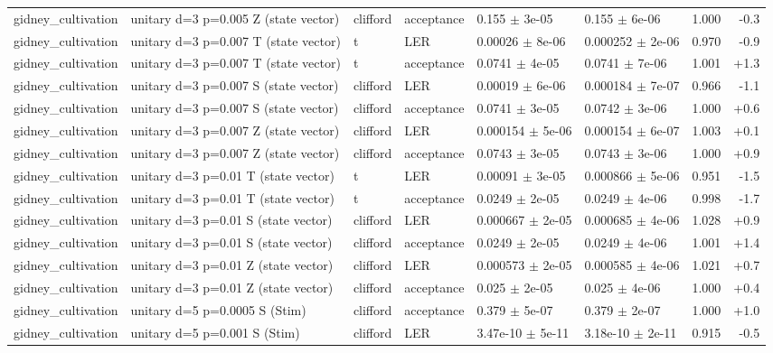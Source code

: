 \documentclass[10pt]{article}
\begin{document}
{\begin{longtable}{l l l l l l r r}
gidney\_cultivation & unitary d=3 p=0.005 Z (state vector) & clifford & acceptance & 0.155 $\pm$ 3e-05 & 0.155 $\pm$ 6e-06 & 1.000 & -0.3 \\
gidney\_cultivation & unitary d=3 p=0.007 T (state vector) & t & LER & 0.00026 $\pm$ 8e-06 & 0.000252 $\pm$ 2e-06 & 0.970 & -0.9 \\
gidney\_cultivation & unitary d=3 p=0.007 T (state vector) & t & acceptance & 0.0741 $\pm$ 4e-05 & 0.0741 $\pm$ 7e-06 & 1.001 & +1.3 \\
gidney\_cultivation & unitary d=3 p=0.007 S (state vector) & clifford & LER & 0.00019 $\pm$ 6e-06 & 0.000184 $\pm$ 7e-07 & 0.966 & -1.1 \\
gidney\_cultivation & unitary d=3 p=0.007 S (state vector) & clifford & acceptance & 0.0741 $\pm$ 3e-05 & 0.0742 $\pm$ 3e-06 & 1.000 & +0.6 \\
gidney\_cultivation & unitary d=3 p=0.007 Z (state vector) & clifford & LER & 0.000154 $\pm$ 5e-06 & 0.000154 $\pm$ 6e-07 & 1.003 & +0.1 \\
gidney\_cultivation & unitary d=3 p=0.007 Z (state vector) & clifford & acceptance & 0.0743 $\pm$ 3e-05 & 0.0743 $\pm$ 3e-06 & 1.000 & +0.9 \\
gidney\_cultivation & unitary d=3 p=0.01 T (state vector) & t & LER & 0.00091 $\pm$ 3e-05 & 0.000866 $\pm$ 5e-06 & 0.951 & -1.5 \\
gidney\_cultivation & unitary d=3 p=0.01 T (state vector) & t & acceptance & 0.0249 $\pm$ 2e-05 & 0.0249 $\pm$ 4e-06 & 0.998 & -1.7 \\
gidney\_cultivation & unitary d=3 p=0.01 S (state vector) & clifford & LER & 0.000667 $\pm$ 2e-05 & 0.000685 $\pm$ 4e-06 & 1.028 & +0.9 \\
gidney\_cultivation & unitary d=3 p=0.01 S (state vector) & clifford & acceptance & 0.0249 $\pm$ 2e-05 & 0.0249 $\pm$ 4e-06 & 1.001 & +1.4 \\
gidney\_cultivation & unitary d=3 p=0.01 Z (state vector) & clifford & LER & 0.000573 $\pm$ 2e-05 & 0.000585 $\pm$ 4e-06 & 1.021 & +0.7 \\
gidney\_cultivation & unitary d=3 p=0.01 Z (state vector) & clifford & acceptance & 0.025 $\pm$ 2e-05 & 0.025 $\pm$ 4e-06 & 1.000 & +0.4 \\
gidney\_cultivation & unitary d=5 p=0.0005 S (Stim) & clifford & acceptance & 0.379 $\pm$ 5e-07 & 0.379 $\pm$ 2e-07 & 1.000 & +1.0 \\
gidney\_cultivation & unitary d=5 p=0.001 S (Stim) & clifford & LER & 3.47e-10 $\pm$ 5e-11 & 3.18e-10 $\pm$ 2e-11 & 0.915 & -0.5 \\

\end{longtable}}
\end{document}
